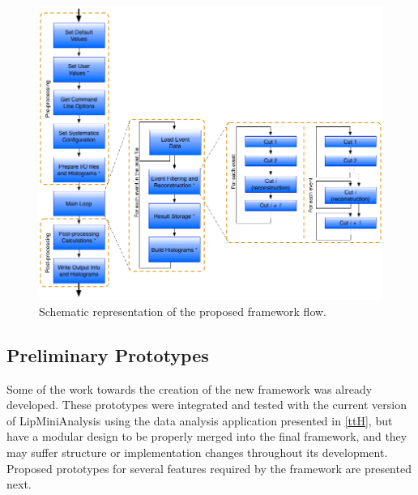 \begin{figure}[!htp]
	\begin{center}
		\includegraphics[scale=0.5]{imgs/new_framework_flow.png}
		\caption{Schematic representation of the proposed framework flow.}
		\label{fig:new_framework_flow}
	\end{center}
\end{figure}




\subsection{Preliminary Prototypes}
\label{work_so_far}

Some of the work towards the creation of the new framework was already developed. These prototypes were integrated and tested with the current version of LipMiniAnalysis using the \ttH data analysis application presented in \ref{ttH}, but have a modular design to be properly merged into the final framework, and they may suffer structure or implementation changes throughout its development. Proposed prototypes for several features required by the framework are presented next.

